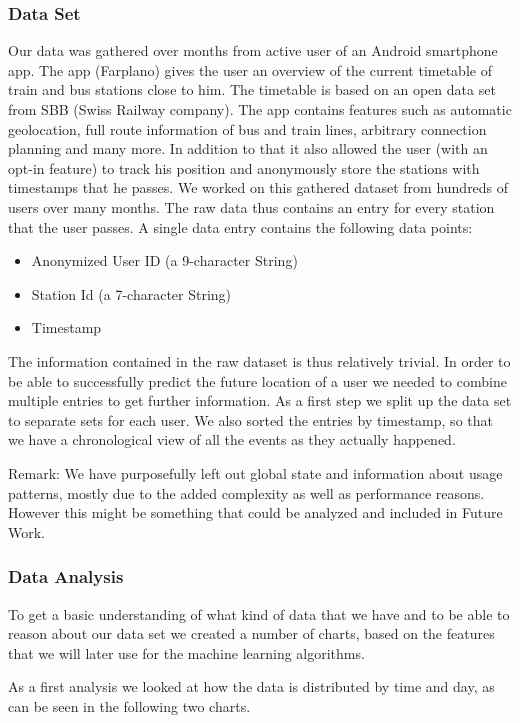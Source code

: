 \subsubsection{Data Set}
Our data was gathered over months from active user of an Android smartphone app. The app (Farplano) gives the user an overview of the current timetable of train and bus stations close to him. The timetable is based on an open data set from SBB (Swiss Railway company). The app contains features such as automatic geolocation, full route information of bus and train lines, arbitrary connection planning and many more. In addition to that it also allowed the user (with an opt-in feature) to track his position and anonymously store the stations with timestamps that he passes. We worked on this gathered dataset from hundreds of users over many months. The raw data thus contains an entry for every station that the user passes. A single data entry contains the following data points:
\begin{itemize}
	\item Anonymized User ID (a 9-character String)
	\item Station Id (a 7-character String)
	\item Timestamp
\end{itemize}
The information contained in the raw dataset is thus relatively trivial. In order to be able to successfully predict the future location of a user we needed to combine multiple entries to get further information. As a first step we split up the data set to separate sets for each user. We also sorted the entries by timestamp, so that we have a chronological view of all the events as they actually happened.

Remark: We have purposefully left out global state and information about usage patterns, mostly due to the added complexity as well as performance reasons. However this might be something that could be analyzed and included in Future Work. 

\subsubsection{Data Analysis}
To get a basic understanding of what kind of data that we have and to be able to reason about our data set we created a number of charts, based on the features that we will later use for the machine learning algorithms. 

As a first analysis we looked at how the data is distributed by time and day, as can be seen in the following two charts.

